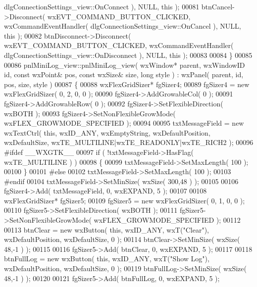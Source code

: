 \begin{DoxyCode}
      dlgConnectionSettings_view::OnConnect ), NULL, \textcolor{keyword}{this} );
00081     btnCancel->Disconnect( wxEVT\_COMMAND\_BUTTON\_CLICKED, wxCommandEventHandler( 
      dlgConnectionSettings_view::OnCancel ), NULL, \textcolor{keyword}{this} );
00082     btnDisconnect->Disconnect( wxEVT\_COMMAND\_BUTTON\_CLICKED, wxCommandEventHandler( 
      dlgConnectionSettings_view::OnDisconnect ), NULL, \textcolor{keyword}{this} );
00083     
00084 \}
00085 
00086 pnlMiniLog_view::pnlMiniLog_view( wxWindow* parent, wxWindowID \textcolor{keywordtype}{id}, \textcolor{keyword}{const} wxPoint& pos, \textcolor{keyword}{const} wxSize& 
      size, \textcolor{keywordtype}{long} style ) : wxPanel( parent, id, pos, size, style )
00087 \{
00088     wxFlexGridSizer* fgSizer4;
00089     fgSizer4 = \textcolor{keyword}{new} wxFlexGridSizer( 0, 2, 0, 0 );
00090     fgSizer4->AddGrowableCol( 0 );
00091     fgSizer4->AddGrowableRow( 0 );
00092     fgSizer4->SetFlexibleDirection( wxBOTH );
00093     fgSizer4->SetNonFlexibleGrowMode( wxFLEX\_GROWMODE\_SPECIFIED );
00094     
00095     txtMessageField = \textcolor{keyword}{new} wxTextCtrl( \textcolor{keyword}{this}, wxID\_ANY, wxEmptyString, wxDefaultPosition, wxDefaultSize, 
      wxTE\_MULTILINE|wxTE\_READONLY|wxTE\_RICH2 );
00096 \textcolor{preprocessor}{    #ifdef \_\_WXGTK\_\_}
00097     \textcolor{keywordflow}{if} ( !txtMessageField->HasFlag( wxTE\_MULTILINE ) )
00098     \{
00099     txtMessageField->SetMaxLength( 100 );
00100     \}
00101 \textcolor{preprocessor}{    #else}
00102     txtMessageField->SetMaxLength( 100 );
00103 \textcolor{preprocessor}{    #endif}
00104     txtMessageField->SetMinSize( wxSize( 300,48 ) );
00105     
00106     fgSizer4->Add( txtMessageField, 0, wxEXPAND, 5 );
00107     
00108     wxFlexGridSizer* fgSizer5;
00109     fgSizer5 = \textcolor{keyword}{new} wxFlexGridSizer( 0, 1, 0, 0 );
00110     fgSizer5->SetFlexibleDirection( wxBOTH );
00111     fgSizer5->SetNonFlexibleGrowMode( wxFLEX\_GROWMODE\_SPECIFIED );
00112     
00113     btnClear = \textcolor{keyword}{new} wxButton( \textcolor{keyword}{this}, wxID\_ANY, wxT(\textcolor{stringliteral}{"Clear"}), wxDefaultPosition, wxDefaultSize, 0 );
00114     btnClear->SetMinSize( wxSize( 48,-1 ) );
00115     
00116     fgSizer5->Add( btnClear, 0, wxEXPAND, 5 );
00117     
00118     btnFullLog = \textcolor{keyword}{new} wxButton( \textcolor{keyword}{this}, wxID\_ANY, wxT(\textcolor{stringliteral}{"Show Log"}), wxDefaultPosition, wxDefaultSize, 0 );
00119     btnFullLog->SetMinSize( wxSize( 48,-1 ) );
00120     
00121     fgSizer5->Add( btnFullLog, 0, wxEXPAND, 5 );

\end{DoxyCode}

